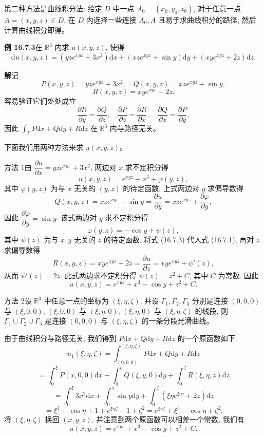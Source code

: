 \documentclass[UTF8, 12pt, fontset=fandol, oneside]{ctexart}
\begin{document}
第二种方法是曲线积分法: 给定 $D$ 中一点 $A_0=(x_0,y_0,z_0)$, 对于任意一点 $A=(x,y,z)\in D$, 在 $D$ 内选择一些连接 $A_0,A$ 且易于求曲线积分的路径, 然后计算曲线积分即得。

\noindent\textbf{例 16.7.3}\quad 在 $\mathbb R^3$ 内求 $u(x,y,z)$, 使得
\[
  \mathrm du(x,y,z)=(yze^{xyz}+3x^2)\mathrm dx+(xze^{xyz}+\sin y)\mathrm dy+(xye^{xyz}+2z)\mathrm dz.
\]

\noindent\textbf{解}\quad 记
\[
  P(x,y,z)=yze^{xyz}+3x^2,\quad Q(x,y,z)=xze^{xyz}+\sin y,
\]
\[
  R(x,y,z)=xye^{xyz}+2z.
\]
容易验证它们处处成立
\[
  \frac{\partial R}{\partial y}=\frac{\partial Q}{\partial z},\quad
  \frac{\partial P}{\partial z}=\frac{\partial R}{\partial x},\quad
  \frac{\partial Q}{\partial x}=\frac{\partial P}{\partial y},
\]
因此 $\int_\Gamma P\mathrm dx+Q\mathrm dy+R\mathrm dz$ 在 $\mathbb R^3$ 内与路径无关。

下面我们用两种方法来求 $u(x,y,z)$。

方法 1\quad 由 $\dfrac{\partial u}{\partial x}=yze^{xyz}+3x^2$, 两边对 $x$ 求不定积分得
\begin{equation}
  u(x,y,z)=e^{xyz}+x^3+\varphi(y,z),
  \tag{16.7.1}
\end{equation}
其中 $\varphi(y,z)$ 为与 $x$ 无关的 $(y,z)$ 的待定函数. 上式两边对 $y$ 求偏导数得
\begin{equation}
  Q(x,y,z)=xze^{xyz}+\sin y
  =\frac{\partial u}{\partial y}
  =xze^{xyz}+\frac{\partial\varphi}{\partial y},
  \tag{16.7.2}
\end{equation}
因此 $\dfrac{\partial\varphi}{\partial y}=\sin y$. 该式两边对 $y$ 求不定积分得
\begin{equation}
  \varphi(y,z)=-\cos y+\psi(z),
  \tag{16.7.3}
\end{equation}
其中 $\psi(z)$ 为与 $x,y$ 无关的 $z$ 的待定函数. 将式 (16.7.3) 代入式 (16.7.1), 再对 $z$ 求偏导数得
\[
  R(x,y,z)=xye^{xyz}+2z=\frac{\partial u}{\partial z}=xye^{xyz}+\psi'(z),
\]
从而 $\psi'(z)=2z$. 此式两边求不定积分得 $\psi(z)=z^2+C$, 其中 $C$ 为常数. 因此
\[
  u(x,y,z)=e^{xyz}+x^3-\cos y+z^2+C.
\]

方法 2\quad 设 $\mathbb R^3$ 中任意一点的坐标为 $(\xi,\eta,\zeta)$, 并设 $\Gamma_1,\Gamma_2,\Gamma_3$ 分别是连接 $(0,0,0)$ 与 $(\xi,0,0)$, $(\xi,0,0)$ 与 $(\xi,\eta,0)$, $(\xi,\eta,0)$ 与 $(\xi,\eta,\zeta)$ 的线段, 则 $\Gamma_1\cup\Gamma_2\cup\Gamma_3$ 是连接 $(0,0,0)$ 与 $(\xi,\eta,\zeta)$ 的一条分段光滑曲线。

由于曲线积分与路径无关, 我们得到 $P\mathrm dx+Q\mathrm dy+R\mathrm dz$ 的一个原函数如下:
\[
  u_1(\xi,\eta,\zeta)
  =\int_{(0,0,0)}^{(\xi,\eta,\zeta)}P\mathrm dx+Q\mathrm dy+R\mathrm dz
\]
\[
  =\int_0^\xi P(x,0,0)\mathrm dx
  +\int_0^\eta Q(\xi,y,0)\mathrm dy
  +\int_0^\zeta R(\xi,\eta,z)\mathrm dz
\]
\[
  =\int_0^\xi 3x^2\mathrm dx+\int_0^\eta\sin y\mathrm dy
  +\int_0^\zeta(\xi\eta e^{\xi\eta z}+2z)\mathrm dz
\]
\[
  =\xi^3-\cos\eta+1+e^{\xi\eta\zeta}-1+\zeta^2
  =e^{\xi\eta\zeta}+\xi^3-\cos\eta+\zeta^2.
\]
将 $(\xi,\eta,\zeta)$ 换回 $(x,y,z)$, 并注意到两个原函数可以相差一个常数, 我们有
\[
  u(x,y,z)=e^{xyz}+x^3-\cos y+z^2+C.
\]
\end{document}

